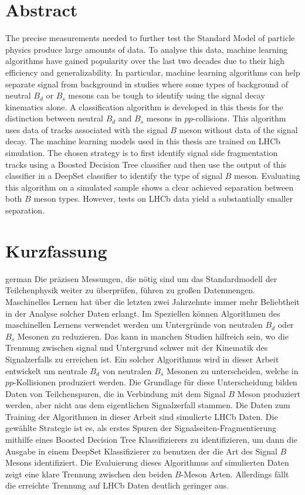 \thispagestyle{plain}

\section*{Abstract}
The precise measurements needed to further test the Standard Model of particle physics produce large amounts of data.
To analyse this data, machine learning algorithms have gained popularity over the last two decades due to their high efficiency and generalizability.
In particular, machine learning algorithms can help separate signal from background in studies where some types of background of neutral $B_d$ or $B_s$ mesons can be tough to identify using the signal decay kinematics alone.
A classification algorithm is developed in this thesis for the distinction between neutral $B_d$ and $B_s$ mesons in $pp$-collisions.
This algorithm uses data of tracks associated with the signal $B$ meson without data of the signal decay. 
The machine learning models used in this thesis are trained on LHCb simulation. 
The chosen strategy is to first identify signal side fragmentation tracks using a Boosted Decision Tree classifier and then use the output of this classifier in a DeepSet classifier to identify the type of signal $B$ meson.
Evaluating this algorithm on a simulated sample shows a clear achieved separation between both $B$ meson types.
However, tests on LHCb data yield a substantially smaller separation.

\section*{Kurzfassung}
\begin{foreignlanguage}{german}
    Die präzisen Messungen, die nötig sind um das Standardmodell der Teilchenphysik weiter zu überprüfen, führen zu großen Datenmengen.
    Maschinelles Lernen hat über die letzten zwei Jahrzehnte immer mehr Beliebtheit in der Analyse solcher Daten erlangt.
    Im Speziellen können Algorithmen des maschinellen Lernens verwendet werden um Untergründe von neutralen $B_d$ oder $B_s$ Mesonen zu reduzieren.
    Das kann in manchen Studien hilfreich sein, wo die Trennung zwischen signal und Untergrund schwer mit der Kinematik des Signalzerfalls zu erreichen ist.
    Ein solcher Algorithmus wird in dieser Arbeit entwickelt um neutrale $B_d$ von neutralen $B_s$ Mesonen zu unterscheiden, welche in $pp$-Kollisionen produziert werden.
    Die Grundlage für diese Unterscheidung bilden Daten von Teilchenspuren, die in Verbindung mit dem Signal $B$ Meson produziert werden, aber nicht aus dem eigentlichen Signalzerfall stammen.
    Die Daten zum Training der Algorithmen in dieser Arbeit sind simulierte LHCb Daten.
    Die gewählte Strategie ist es, als erstes Spuren der Signalseiten-Fragmentierung mithilfe eines Boosted Decision Tree Klassifizierers zu identifizieren,
    um dann die Ausgabe in einem DeepSet Klassifizierer zu benutzen der die Art des Signal $B$ Mesons identifiziert.
    Die Evaluierung dieses Algorithmus auf simulierten Daten zeigt eine klare Trennung zwischen den beiden $B$-Meson Arten.
    Allerdings fällt die erreichte Trennung auf LHCb Daten deutlich geringer aus.
\end{foreignlanguage}

